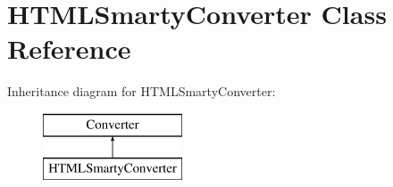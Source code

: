 \hypertarget{class_h_t_m_l_smarty_converter}{\section{\-H\-T\-M\-L\-Smarty\-Converter \-Class \-Reference}
\label{class_h_t_m_l_smarty_converter}
}
\-Inheritance diagram for \-H\-T\-M\-L\-Smarty\-Converter\-:\begin{figure}[H]
\begin{center}
\leavevmode
\includegraphics[height=2.000000cm]{class_h_t_m_l_smarty_converter}
\end{center}
\end{figure}
